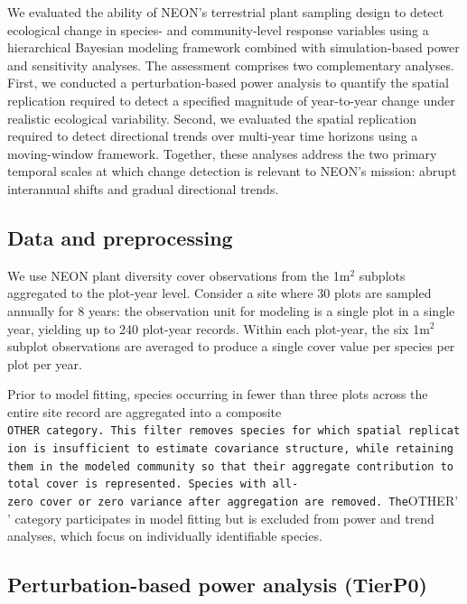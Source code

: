 \documentclass[
  11pt,
]{article}
\begin{document}
We evaluated the ability of NEON's terrestrial plant sampling design to
detect ecological change in species- and community-level response
variables using a hierarchical Bayesian modeling framework combined with
simulation-based power and sensitivity analyses. The assessment
comprises two complementary analyses. First, we conducted a
perturbation-based power analysis to quantify the spatial replication
required to detect a specified magnitude of year-to-year change under
realistic ecological variability. Second, we evaluated the spatial
replication required to detect directional trends over multi-year time
horizons using a moving-window framework. Together, these analyses
address the two primary temporal scales at which change detection is
relevant to NEON's mission: abrupt interannual shifts and gradual
directional trends.

\subsection{Data and preprocessing}\label{data-and-preprocessing}

We use NEON plant diversity cover observations from the 1m\(^2\)
subplots aggregated to the plot-year level. Consider a site where 30
plots are sampled annually for 8 years: the observation unit for
modeling is a single plot in a single year, yielding up to 240 plot-year
records. Within each plot-year, the six 1m\(^2\) subplot observations
are averaged to produce a single cover value per species per plot per
year.

Prior to model fitting, species occurring in fewer than three plots
across the entire site record are aggregated into a composite
\texttt{OTHER\textquotesingle{}\textquotesingle{}\ category.\ This\ filter\ removes\ species\ for\ which\ spatial\ replication\ is\ insufficient\ to\ estimate\ covariance\ structure,\ while\ retaining\ them\ in\ the\ modeled\ community\ so\ that\ their\ aggregate\ contribution\ to\ total\ cover\ is\ represented.\ Species\ with\ all-zero\ cover\ or\ zero\ variance\ after\ aggregation\ are\ removed.\ The}OTHER'\,'
category participates in model fitting but is excluded from power and
trend analyses, which focus on individually identifiable species.

\subsection{Perturbation-based power analysis
(TierP0)}\label{perturbation-based-power-analysis-tierp0}
\end{document}
